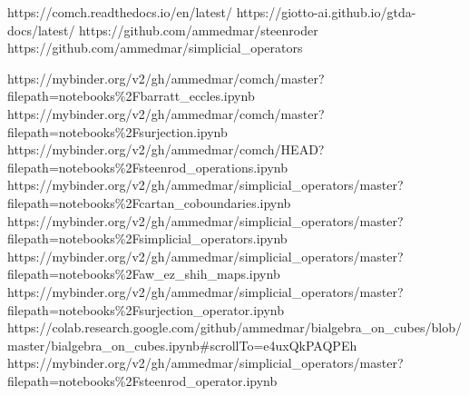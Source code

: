 
		{https://comch.readthedocs.io/en/latest/}
		{https://giotto-ai.github.io/gtda-docs/latest/}
		{https://github.com/ammedmar/steenroder}
		{https://github.com/ammedmar/simplicial_operators}

\vspace*{-10pt}
		{https://mybinder.org/v2/gh/ammedmar/comch/master?filepath=notebooks\%2Fbarratt_eccles.ipynb}
		{https://mybinder.org/v2/gh/ammedmar/comch/master?filepath=notebooks\%2Fsurjection.ipynb}
		{https://mybinder.org/v2/gh/ammedmar/comch/HEAD?filepath=notebooks\%2Fsteenrod_operations.ipynb}
		{https://mybinder.org/v2/gh/ammedmar/simplicial_operators/master?filepath=notebooks\%2Fcartan_coboundaries.ipynb}
		{https://mybinder.org/v2/gh/ammedmar/simplicial_operators/master?filepath=notebooks\%2Fsimplicial_operators.ipynb}
		{https://mybinder.org/v2/gh/ammedmar/simplicial_operators/master?filepath=notebooks\%2Faw_ez_shih_maps.ipynb}
		{https://mybinder.org/v2/gh/ammedmar/simplicial_operators/master?filepath=notebooks\%2Fsurjection_operator.ipynb}
		{https://colab.research.google.com/github/ammedmar/bialgebra_on_cubes/blob/master/bialgebra_on_cubes.ipynb\#scrollTo=e4uxQkPAQPEh}
		{https://mybinder.org/v2/gh/ammedmar/simplicial_operators/master?filepath=notebooks\%2Fsteenrod_operator.ipynb}